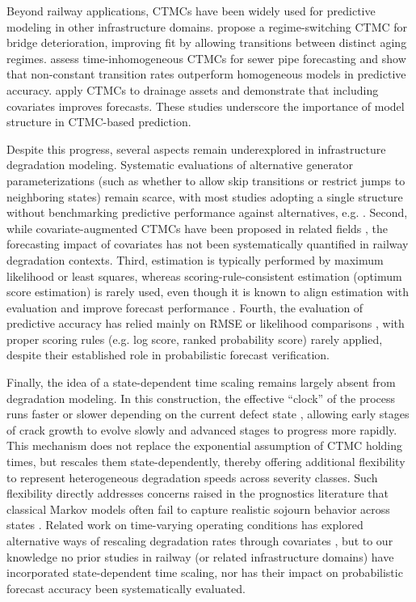 Beyond railway applications, CTMCs have been widely used for predictive modeling in other infrastructure domains. \citet{Mizutani2023RegimeSwitching} propose a regime-switching CTMC for bridge deterioration, improving fit by allowing transitions between distinct aging regimes. \citet{JimenezRoa2024Nonhomogeneous} assess time-inhomogeneous CTMCs for sewer pipe forecasting and show that non-constant transition rates outperform homogeneous models in predictive accuracy. \citet{Wu2021ConditionPrediction} apply CTMCs to drainage assets and demonstrate that including covariates improves forecasts. These studies underscore the importance of model structure in CTMC-based prediction.

Despite this progress, several aspects remain underexplored in infrastructure degradation modeling.
Systematic evaluations of alternative generator parameterizations (such as whether to allow skip transitions or restrict jumps to neighboring states) remain scarce, with most studies adopting a single structure without benchmarking predictive performance against alternatives, e.g. \citep{bisgaard2024A,Zbiciak2025}.
Second, while covariate-augmented CTMCs have been proposed in related fields \citep{Wu2021ConditionPrediction}, the forecasting impact of covariates has not been systematically quantified in railway degradation contexts.
Third, estimation is typically performed by maximum likelihood or least squares, whereas scoring-rule-consistent estimation (optimum score estimation) is rarely used, even though it is known to align estimation with evaluation and improve forecast performance \citep{Gneiting2007,friedman1983a,Copas1983}.
Fourth, the evaluation of predictive accuracy has relied mainly on RMSE or likelihood comparisons \citep{JimenezRoa2024Nonhomogeneous,Mizutani2023RegimeSwitching}, with proper scoring rules (e.g. log score, ranked probability score) rarely applied, despite their established role in probabilistic forecast verification.

Finally, the idea of a state-dependent time scaling remains largely absent from degradation modeling. In this construction, the effective “clock” of the process runs faster or slower depending on the current defect state \citep{AITSAHALIA20101}, allowing early stages of crack growth to evolve slowly and advanced stages to progress more rapidly. This mechanism does not replace the exponential assumption of CTMC holding times, but rescales them state-dependently, thereby offering additional flexibility to represent heterogeneous degradation speeds across severity classes. Such flexibility directly addresses concerns raised in the prognostics literature that classical Markov models often fail to capture realistic sojourn behavior across states \citep{AIZPURUA2022}. Related work on time-varying operating conditions has explored alternative ways of rescaling degradation rates through covariates \citep{liu2024a}, but to our knowledge no prior studies in railway (or related infrastructure domains) have incorporated state-dependent time scaling, nor has their impact on probabilistic forecast accuracy been systematically evaluated.



